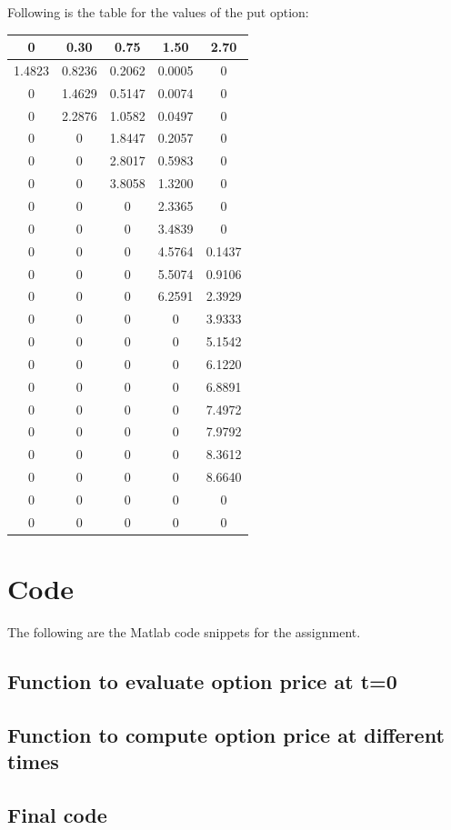 \documentclass[12pt]{article}
\begin{document}
\newpage
Following is the table for the values of the put option:
  \begin{center}
    \begin{tabular}{ccccc}
    0 &0.30 &0.75 &1.50 &2.70\\ \hline
    1.4823	&0.8236	&0.2062	&0.0005	&0\\
    0	                &1.4629	&0.5147	&0.0074	&0\\
    0	                &2.2876	&1.0582	&0.0497	    &0\\
    0	                &0	                &1.8447	&0.2057	    &0\\
    0	                &0	                &2.8017	&0.5983	    &0\\
    0	                &0	                &3.8058	&1.3200	    &0\\
    0	                &0	                &0	                &2.3365	    &0\\
    0	                &0	                &0	                &3.4839	    &0\\
    0	                &0	                &0	                &4.5764	&0.1437\\
    0	                &0	                &0	                &5.5074	&0.9106\\
    0	                &0	&0	&6.2591	&2.3929\\
    0	&0	&0	&0	&3.9333\\
    0	&0	&0	&0	&5.1542\\
    0	&0	&0	&0	&6.1220\\
    0	&0	&0	&0	&6.8891\\
    0	&0	&0	&0	&7.4972\\
    0	&0	&0	&0	&7.9792\\
    0	&0	&0	&0	&8.3612\\
    0	&0	&0	&0	&8.6640\\
    0	&0	&0	&0	&0\\
    0	&0	&0	&0	&0\\ \hline
    \end{tabular}
  \end{center}

\section{Code}
The following are the Matlab code snippets for the assignment.\\
 \subsection*{Function to evaluate option price at t=0}
   
 \subsection*{Function to compute option price at different times}
    
  \subsection*{Final code}
    
\end{document}
